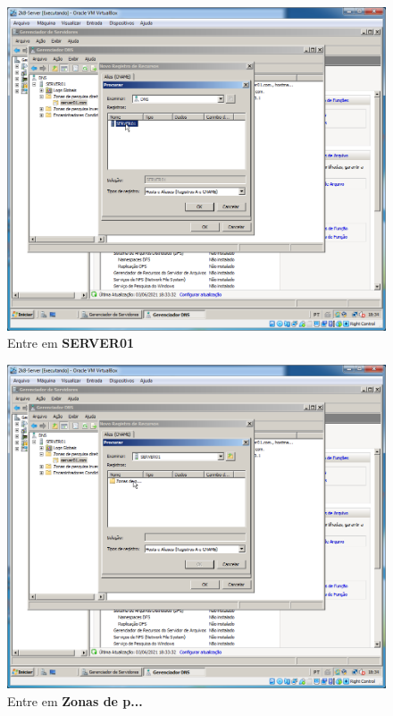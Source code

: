 \documentclass[10pt]{article}
\begin{document}
\begin{figure}[H]
    \centering
    \caption{Entre em \textbf{SERVER01}}
    \label{fig:DNS035}
    \includegraphics[width=\linewidth]{images/windows_server/dns/035.png}
\end{figure}
\begin{figure}[H]
    \centering
    \caption{Entre em \textbf{Zonas de p...}}
    \label{fig:DNS036}
    \includegraphics[width=\linewidth]{images/windows_server/dns/036.png}
\end{figure}
\end{document}
